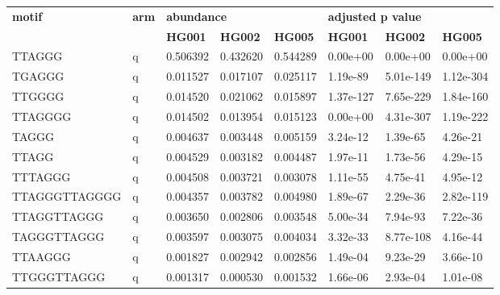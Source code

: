 \begin{samepage} \begin{table}[h!] \small \begin{tabular}{llllllll}
\hline
\textbf{motif}  & \textbf{arm} & \multicolumn{3}{l}{\textbf{abundance}}           & \multicolumn{3}{l}{\textbf{adjusted p value}}    \\
\textbf{}       & \textbf{}    & \textbf{HG001} & \textbf{HG002} & \textbf{HG005} & \textbf{HG001} & \textbf{HG002} & \textbf{HG005} \\
\hline
TTAGGG          & q            & 0.506392       &  0.432620      &  0.544289      &  0.00e+00      &  0.00e+00      &  0.00e+00      \\
TGAGGG          & q            & 0.011527       &  0.017107      &  0.025117      &  1.19e-89      &  5.01e-149     &  1.12e-304     \\
TTGGGG          & q            & 0.014520       &  0.021062      &  0.015897      &  1.37e-127     &  7.65e-229     &  1.84e-160     \\
TTAGGGG         & q            & 0.014502       &  0.013954      &  0.015123      &  0.00e+00      &  4.31e-307     &  1.19e-222     \\
TAGGG           & q            & 0.004637       &  0.003448      &  0.005159      &  3.24e-12      &  1.39e-65      &  4.26e-21      \\
TTAGG           & q            & 0.004529       &  0.003182      &  0.004487      &  1.97e-11      &  1.73e-56      &  4.29e-15      \\
TTTAGGG         & q            & 0.004508       &  0.003721      &  0.003078      &  1.11e-55      &  4.75e-41      &  4.95e-12      \\
TTAGGGTTAGGGG   & q            & 0.004357       &  0.003782      &  0.004980      &  1.89e-67      &  2.29e-36      &  2.82e-119     \\
TTAGGTTAGGG     & q            & 0.003650       &  0.002806      &  0.003548      &  5.00e-34      &  7.94e-93      &  7.22e-36      \\
TAGGGTTAGGG     & q            & 0.003597       &  0.003075      &  0.004034      &  3.32e-33      &  8.77e-108     &  4.16e-44      \\
TTAAGGG         & q            & 0.001827       &  0.002942      &  0.002856      &  1.49e-04      &  9.23e-29      &  3.66e-10      \\
TTGGGTTAGGG     & q            & 0.001317       &  0.000530      &  0.001532      &  1.66e-06      &  2.93e-04      &  1.01e-08      \\

\end{tabular}
\end{table}
\end{samepage}
